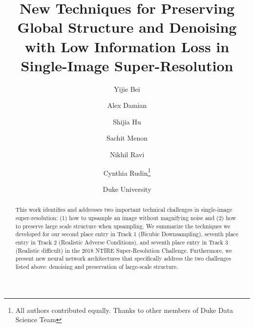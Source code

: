 \documentclass[10pt,twocolumn,letterpaper]{article}
\begin{document}
\title{New Techniques for Preserving Global Structure and Denoising with Low Information Loss in Single-Image Super-Resolution}


\author{Yijie Bei \and \hspace*{-5pt} 
Alex Damian \and \hspace*{-5pt} 
Shijia Hu \and \hspace*{-5pt} 
Sachit Menon \and \hspace*{-5pt} 
Nikhil Ravi \and \hspace*{-5pt} 
Cynthia Rudin\thanks{All authors contributed equally. Thanks to other members of Duke Data Science Team} \and Duke University}


\maketitle

\begin{abstract}
  This work identifies and addresses two important technical challenges in single-image super-resolution: (1) how to upsample an image without magnifying noise and (2) how to preserve large scale structure when upsampling. We summarize the techniques we developed for our second place entry in Track 1 (Bicubic Downsampling), seventh place entry in Track 2 (Realistic Adverse Conditions), and seventh place entry in Track 3 (Realistic difficult) in the 2018 NTIRE Super-Resolution Challenge. Furthermore, we present new neural network architectures that specifically address the two challenges listed above: denoising and preservation of large-scale structure. 
\end{abstract}
\end{document}
